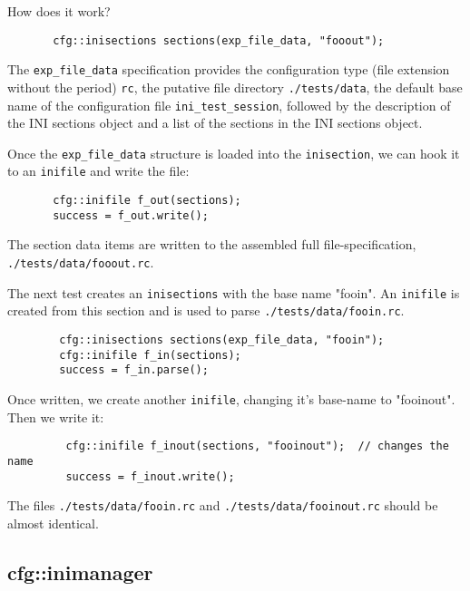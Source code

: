    How does it work?

   \begin{verbatim}
       cfg::inisections sections(exp_file_data, "fooout");
   \end{verbatim}

   The \texttt{exp\_file\_data} specification provides
   the configuration type (file extension without the period)
   \texttt{rc},
   the putative file directory
   \texttt{./tests/data},
   the default base name of the configuration file
   \texttt{ini\_test\_session},
   followed by the description of the INI sections object and
   a list of the sections in the INI sections object.

   Once the \texttt{exp\_file\_data} structure is loaded into the
   \texttt{inisection}, we can hook it to an \texttt{inifile} and
   write the file:

   \begin{verbatim}
       cfg::inifile f_out(sections);
       success = f_out.write();
   \end{verbatim}

   The section data items are written to the assembled full
   file-specification, \texttt{./tests/data/fooout.rc}.

   The next test creates an \texttt{inisections} with the base name
   "fooin". An \texttt{inifile} is created from this section and
   is used to parse \texttt{./tests/data/fooin.rc}.

   \begin{verbatim}
        cfg::inisections sections(exp_file_data, "fooin");
        cfg::inifile f_in(sections);
        success = f_in.parse();
   \end{verbatim}

   Once written, we create another \texttt{inifile}, changing it's base-name
   to "fooinout". Then we write it:

   \begin{verbatim}
         cfg::inifile f_inout(sections, "fooinout");  // changes the name
         success = f_inout.write();
   \end{verbatim}

   The files \texttt{./tests/data/fooin.rc} and 
   \texttt{./tests/data/fooinout.rc} should be almost identical.

\subsection{cfg::inimanager}
\label{subsec:cfg_namespace_inimanager}
         
